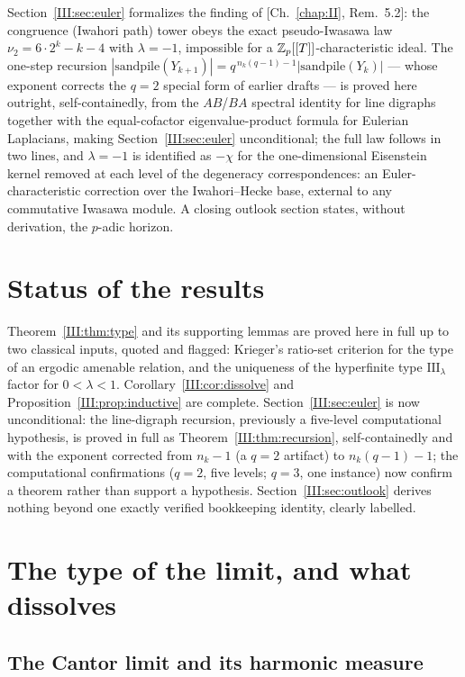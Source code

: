 \begin{chapterabstract}
Section~\ref{III:sec:euler} formalizes the finding of [Ch.~\ref{chap:II}, Rem.~5.2]: the congruence
(Iwahori path) tower obeys the exact pseudo-Iwasawa law $\nu_2=6\cdot2^k-k-4$ with
$\lambda=-1$, impossible for a $\mathbb{Z}_p[[T]]$-characteristic ideal. The one-step
recursion $|\mathrm{sandpile}(Y_{k+1})|=q^{\,n_k(q-1)-1}|\mathrm{sandpile}(Y_k)|$ ---
whose exponent corrects the $q=2$ special form of earlier drafts --- is proved here
outright, self-containedly, from the $AB$/$BA$ spectral identity for line digraphs
together with the equal-cofactor eigenvalue-product formula for Eulerian Laplacians,
making Section~\ref{III:sec:euler} unconditional; the full law follows in two lines, and
$\lambda=-1$ is identified as $-\chi$ for the one-dimensional Eisenstein kernel removed
at each level of the degeneracy correspondences: an Euler-characteristic correction
over the Iwahori--Hecke base, external to any commutative Iwasawa module. A closing
outlook section states, without derivation, the $p$-adic horizon.
\end{chapterabstract}

\section*{Status of the results}

Theorem~\ref{III:thm:type} and its supporting lemmas are proved here in full up to two
classical inputs, quoted and flagged: Krieger's ratio-set criterion for the type of an
ergodic amenable relation, and the uniqueness of the hyperfinite type
$\mathrm{III}_\lambda$ factor for $0<\lambda<1$. Corollary~\ref{III:cor:dissolve} and
Proposition~\ref{III:prop:inductive} are complete. Section~\ref{III:sec:euler} is now
unconditional: the line-digraph recursion, previously a five-level computational
hypothesis, is proved in full as Theorem~\ref{III:thm:recursion}, self-containedly and
with the exponent corrected from $n_k-1$ (a $q=2$ artifact) to $n_k(q-1)-1$; the
computational confirmations ($q=2$, five levels; $q=3$, one instance) now confirm a
theorem rather than support a hypothesis. Section~\ref{III:sec:outlook} derives nothing
beyond one exactly verified bookkeeping identity, clearly labelled.

\section{The type of the limit, and what dissolves}\label{III:sec:type}

\subsection{The Cantor limit and its harmonic measure}

